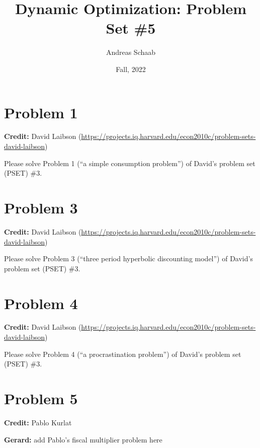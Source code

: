 \documentclass[11pt]{extarticle}
\title{Dynamic Optimization: Problem Set \#5}
\author{Andreas Schaab}
\date{Fall, 2022}
\theoremstyle{plain}
\theoremstyle{definition}
\begin{document}
\maketitle
\thispagestyle{empty}
\setcounter{page}{0}



\vspace{10mm}
\section*{Problem 1}

\textbf{Credit:} David Laibson (\url{https://projects.iq.harvard.edu/econ2010c/problem-sets-david-laibson})

Please solve Problem 1 (``a simple consumption problem'') of David's problem set (PSET) \#3.



\vspace{10mm}
\section*{Problem 3}

\textbf{Credit:} David Laibson (\url{https://projects.iq.harvard.edu/econ2010c/problem-sets-david-laibson})

Please solve Problem 3 (``three period hyperbolic discounting model'') of David's problem set (PSET) \#3.



\vspace{10mm}
\section*{Problem 4}

\textbf{Credit:} David Laibson (\url{https://projects.iq.harvard.edu/econ2010c/problem-sets-david-laibson})

Please solve Problem 4 (``a procrastination problem'') of David's problem set (PSET) \#3.





\vspace{10mm}
\section*{Problem 5}

\textbf{Credit:} Pablo Kurlat

\textbf{Gerard:} add Pablo's fiscal multiplier problem here
\end{document}
